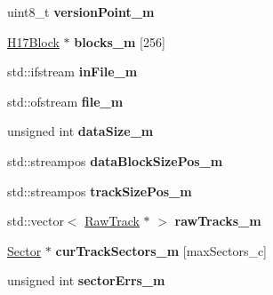 \begin{DoxyCompactItemize}
\item 
\hypertarget{classH17Disk_a6b076c30a6370615424ab9858db65158}{}uint8\+\_\+t {\bfseries version\+Point\+\_\+m}\label{classH17Disk_a6b076c30a6370615424ab9858db65158}

\item 
\hypertarget{classH17Disk_a402b049d3a8b40631f057564d45b0ff6}{}\hyperlink{classH17Block}{H17\+Block} $\ast$ {\bfseries blocks\+\_\+m} \mbox{[}256\mbox{]}\label{classH17Disk_a402b049d3a8b40631f057564d45b0ff6}

\item 
\hypertarget{classH17Disk_a3d0a09a0ffa8b191378fcf7af2340504}{}std\+::ifstream {\bfseries in\+File\+\_\+m}\label{classH17Disk_a3d0a09a0ffa8b191378fcf7af2340504}

\item 
\hypertarget{classH17Disk_a2fbb3e436545a76ac93b2fe4edf9c992}{}std\+::ofstream {\bfseries file\+\_\+m}\label{classH17Disk_a2fbb3e436545a76ac93b2fe4edf9c992}

\item 
\hypertarget{classH17Disk_a5cacf1ebefc3747a7fdd285f39859c4f}{}unsigned int {\bfseries data\+Size\+\_\+m}\label{classH17Disk_a5cacf1ebefc3747a7fdd285f39859c4f}

\item 
\hypertarget{classH17Disk_aee2cc50a379661f551c3c2dc01676320}{}std\+::streampos {\bfseries data\+Block\+Size\+Pos\+\_\+m}\label{classH17Disk_aee2cc50a379661f551c3c2dc01676320}

\item 
\hypertarget{classH17Disk_ae0e2dda11e979df7749be2a6f4090a74}{}std\+::streampos {\bfseries track\+Size\+Pos\+\_\+m}\label{classH17Disk_ae0e2dda11e979df7749be2a6f4090a74}

\item 
\hypertarget{classH17Disk_adbb1ec562a4101fb1e9086e367fc83d6}{}std\+::vector$<$ \hyperlink{classRawTrack}{Raw\+Track} $\ast$ $>$ {\bfseries raw\+Tracks\+\_\+m}\label{classH17Disk_adbb1ec562a4101fb1e9086e367fc83d6}

\item 
\hypertarget{classH17Disk_a49f2f0ec5b217018bd69b4a77d2cd9fa}{}\hyperlink{classSector}{Sector} $\ast$ {\bfseries cur\+Track\+Sectors\+\_\+m} \mbox{[}max\+Sectors\+\_\+c\mbox{]}\label{classH17Disk_a49f2f0ec5b217018bd69b4a77d2cd9fa}

\item 
\hypertarget{classH17Disk_aac87ed97c6b59cd3ba06e3a7dc1a3e29}{}unsigned int {\bfseries sector\+Errs\+\_\+m}\label{classH17Disk_aac87ed97c6b59cd3ba06e3a7dc1a3e29}

\end{DoxyCompactItemize}
